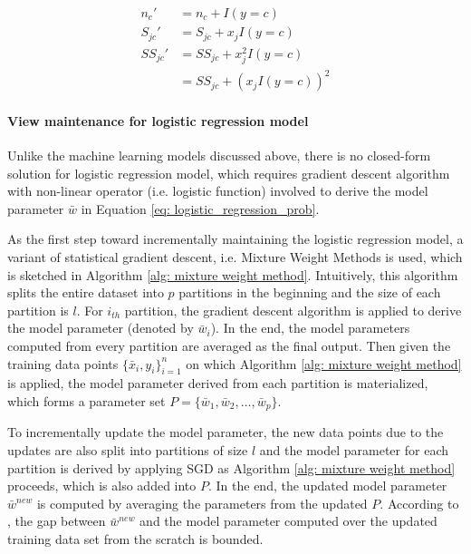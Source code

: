 \begin{equation}
    \begin{split}
        n_c' &= n_c + I(y=c)\\
        S_{jc}' &= S_{jc} + x_jI(y=c)\\
        SS_{jc}'&= SS_{jc} + x_j^2I(y=c)\\ &= SS_{jc} + (x_jI(y=c))^2
    \end{split}
\end{equation}

\paragraph{View maintenance for logistic regression model}
Unlike the machine learning models discussed above, there is no closed-form solution for logistic regression model, which requires gradient descent algorithm with non-linear operator (i.e. logistic function) involved to derive the model parameter $\bar{w}$ in Equation \ref{eq: logistic_regression_prob}. 

As the first step toward incrementally maintaining the logistic regression model, a variant of statistical gradient descent, i.e. Mixture Weight Methods \cite{mcdonald2009efficient} is used, which is sketched in Algorithm \ref{alg: mixture weight method}. Intuitively, this algorithm splits the entire dataset into $p$ partitions in the beginning and the size of each partition is $l$. For $i_{th}$ partition, the gradient descent algorithm is applied to derive the model parameter (denoted by $\bar{w}_i$). In the end, the model parameters computed from every partition are averaged as the final output. Then given the training data points $\{\bar{x}_i, y_i\}_{i=1}^n$ on which Algorithm \ref{alg: mixture weight method} is applied, the model parameter derived from each partition is materialized, which forms a parameter set $P = \{\bar{w}_1, \bar{w}_2, \dots, \bar{w}_p\}$. 

To incrementally update the model parameter, the new data points due to the updates are also split into partitions of size $l$ and the model parameter for each partition is derived by applying SGD as Algorithm \ref{alg: mixture weight method} proceeds, which is also added into $P$. In the end, the updated model parameter $\bar{w}^{new}$ is computed by averaging the parameters from the updated $P$. According to \cite{mcdonald2009efficient}, the gap between $\bar{w}^{new}$ and the model parameter computed over the updated training data set from the scratch is bounded.


